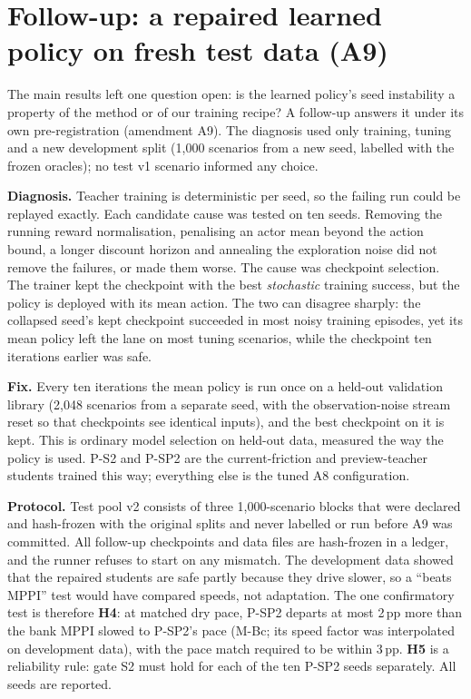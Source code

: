 \documentclass[11pt]{article}
\begin{document}
\section{Follow-up: a repaired learned policy on fresh test data (A9)}\label{sec:followup}
The main results left one question open: is the learned policy's seed instability a property of the method or of
our training recipe? A follow-up answers it under its own pre-registration (amendment A9). The diagnosis used only
training, tuning and a new development split (1,000 scenarios from a new seed, labelled with the frozen oracles);
no test v1 scenario informed any choice.

\textbf{Diagnosis.} Teacher training is deterministic per seed, so the failing run could be replayed exactly. Each
candidate cause was tested on ten seeds. Removing the running reward normalisation, penalising an actor mean beyond
the action bound, a longer discount horizon and annealing the exploration noise did not remove the failures, or
made them worse. The cause was checkpoint selection. The trainer kept the checkpoint with the best \emph{stochastic}
training success, but the policy is deployed with its mean action. The two can disagree sharply: the collapsed
seed's kept checkpoint succeeded in most noisy training episodes, yet its mean policy left the lane on most tuning
scenarios, while the checkpoint ten iterations earlier was safe.

\textbf{Fix.} Every ten iterations the mean policy is run once on a held-out validation library (2,048 scenarios
from a separate seed, with the observation-noise stream reset so that checkpoints see identical inputs), and the
best checkpoint on it is kept. This is ordinary model selection on held-out data, measured the way the policy is
used. P-S2 and P-SP2 are the current-friction and preview-teacher students trained this way; everything else is
the tuned A8 configuration.

\textbf{Protocol.} Test pool v2 consists of three 1,000-scenario blocks that were declared and hash-frozen with
the original splits and never labelled or run before A9 was committed. All follow-up checkpoints and data files
are hash-frozen in a ledger, and the runner refuses to start on any mismatch. The development data showed that the
repaired students are safe partly because they drive slower, so a ``beats MPPI'' test would have compared speeds,
not adaptation. The one confirmatory test is therefore \textbf{H4}: at matched dry pace, P-SP2 departs at most
2\,pp more than the bank MPPI slowed to P-SP2's pace (M-Bc; its speed factor was interpolated on development data),
with the pace match required to be within 3\,pp. \textbf{H5} is a reliability rule: gate S2 must hold for each of
the ten P-SP2 seeds separately. All seeds are reported.
\end{document}
